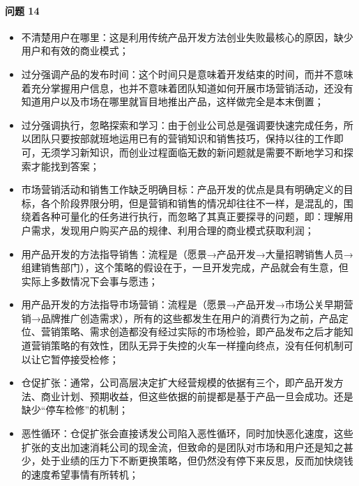 \documentclass[letterpaper,10pt,english]{sphinxmanual}
\begin{document}
\paragraph{问题 14\sphinxfootnotemark[812]}
\label{\detokenize{chapter_project/Scrum:id1}}%
\begin{footnotetext}[812]\sphinxAtStartFootnote
{}
%
\end{footnotetext}\ignorespaces \begin{itemize}
\item {} 
不清楚用户在哪里：这是利用传统产品开发方法创业失败最核心的原因，缺少用户和有效的商业模式；

\item {} 
过分强调产品的发布时间：这个时间只是意味着开发结束的时间，而并不意味着充分掌握用户信息，也并不意味着团队知道如何开展市场营销活动，还没有知道用户以及市场在哪里就盲目地推出产品，这样做完全是本末倒置；

\item {} 
过分强调执行，忽略探索和学习：由于创业公司总是强调要快速完成任务，所以团队只要按部就班地运用已有的营销知识和销售技巧，保持以往的工作即可，无须学习新知识，而创业过程面临无数的新问题就是需要不断地学习和探索才能找到答案；

\item {} 
市场营销活动和销售工作缺乏明确目标：产品开发的优点是具有明确定义的目标，各个阶段界限分明，但是营销和销售的情况却往往不一样，是混乱的，围绕着各种可量化的任务进行执行，而忽略了其真正要探寻的问题，即：理解用户需求，发现用户购买产品的规律、利用合理的商业模式获取利润；

\item {} 
用产品开发的方法指导销售：流程是（愿景→产品开发→大量招聘销售人员→组建销售部门），这个策略的假设在于，一旦开发完成，产品就会有生意，但实际上多数情况下会事与愿违；

\item {} 
用产品开发的方法指导市场营销：流程是（愿景→产品开发→市场公关早期营销→品牌推广创造需求），所有的这些都发生在用户的消费行为之前，产品定位、营销策略、需求创造都没有经过实际的市场检验，即产品发布之后才能知道营销策略的有效性，团队无异于失控的火车一样撞向终点，没有任何机制可以让它暂停接受检修；

\item {} 
仓促扩张：通常，公司高层决定扩大经营规模的依据有三个，即产品开发方法、商业计划、预期收益，但这些依据的前提都是基于产品一旦会成功。还是缺少“停车检修”的机制；

\item {} 
恶性循环：仓促扩张会直接诱发公司陷入恶性循环，同时加快恶化速度，这些扩张的支出加速消耗公司的现金流，但致命的是团队对市场和用户还是知之甚少，处于业绩的压力下不断更换策略，但仍然没有停下来反思，反而加快烧钱的速度希望事情有所转机；


\end{itemize}
\end{document}
